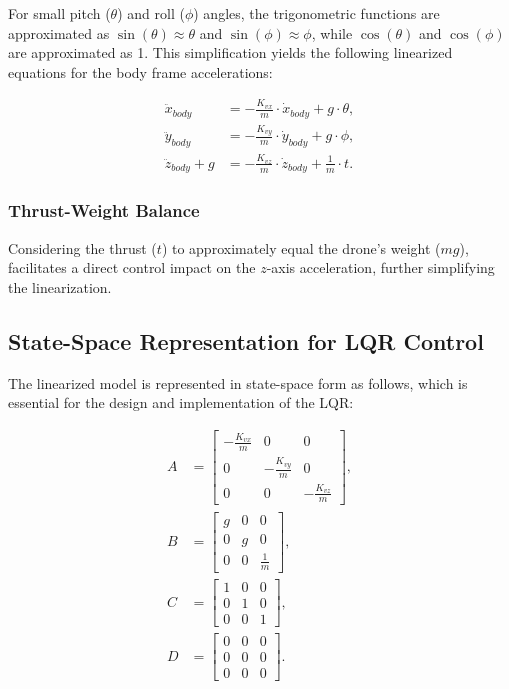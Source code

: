 For small pitch (\(\theta\)) and roll (\(\phi\)) angles, the trigonometric functions are approximated as \(\sin(\theta) \approx \theta\) and \(\sin(\phi) \approx \phi\), while \(\cos(\theta)\) and \(\cos(\phi)\) are approximated as 1. This simplification yields the following linearized equations for the body frame accelerations:

\begin{align}
\ddot{x}_{body} &= -\frac{K_{vx}}{m} \cdot \dot{x}_{body} + g \cdot \theta, \\
\ddot{y}_{body} &= -\frac{K_{vy}}{m} \cdot \dot{y}_{body} + g \cdot \phi, \\
\ddot{z}_{body} + g &= -\frac{K_{vz}}{m} \cdot \dot{z}_{body} + \frac{1}{m} \cdot t.
\end{align}

\subsubsection{Thrust-Weight Balance}

Considering the thrust (\(t\)) to approximately equal the drone's weight (\(mg\)), facilitates a direct control impact on the \(z\)-axis acceleration, further simplifying the linearization.

\subsection{State-Space Representation for LQR Control}

The linearized model is represented in state-space form as follows, which is essential for the design and implementation of the LQR:

\begin{align}
A &= \begin{bmatrix} -\frac{K_{vx}}{m} & 0 & 0 \\ 0 & -\frac{K_{vy}}{m} & 0 \\ 0 & 0 & -\frac{K_{vz}}{m} \end{bmatrix}, \\
B &= \begin{bmatrix} g & 0 & 0 \\ 0 & g & 0 \\ 0 & 0 & \frac{1}{m} \end{bmatrix}, \\
C &= \begin{bmatrix} 1 & 0 & 0 \\ 0 & 1 & 0 \\ 0 & 0 & 1 \end{bmatrix}, \\
D &= \begin{bmatrix} 0 & 0 & 0 \\ 0 & 0 & 0 \\ 0 & 0 & 0 \end{bmatrix}.
\end{align}

